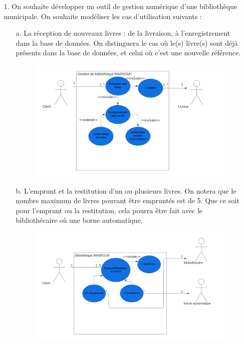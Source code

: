 \documentclass[12pt]{article}
\begin{document}
\begin{itemize}
		\item [1. ] On souhaite développer un outil de gestion numérique d’une bibliothèque municipale. On
		souhaite modéliser les cas d’utilisation suivants :
		\begin{itemize}
			\item[a. ] La réception de nouveaux livres : de la livraison, à l’enregistrement dans la base de
			données. On distinguera le cas où le(s) livre(s) sont déjà présents dans la base de
			données, et celui où c’est une nouvelle référence.
				\begin{figure}[!hbtp]
				\includegraphics[scale=0.75]{capture1_S_2.png}
			\end{figure}
			\item[b. ] L’emprunt et la restitution d’un ou plusieurs livres. On notera que le nombre
			maximum de livres pouvant être empruntés est de 5. Que ce soit pour l’emprunt ou
			la restitution, cela pourra être fait avec le bibliothécaire où une borne automatique.
			\newpage
			\begin{figure}[!hbtp]
				\includegraphics[scale=0.75]{capture2_S.png}

\end{figure}
\end{itemize}
\end{itemize}
\end{document}
